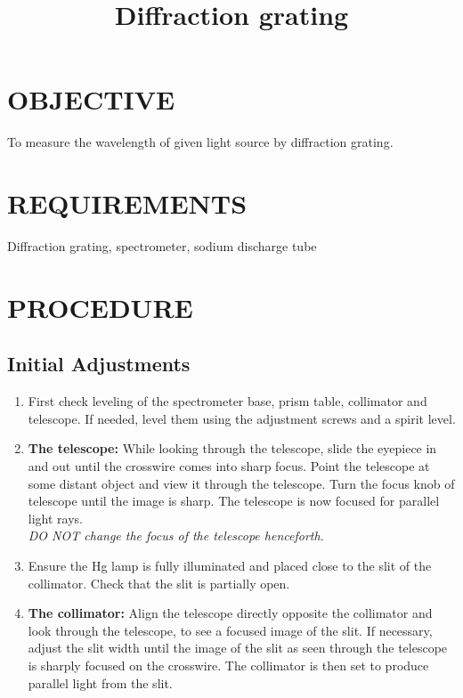 \documentclass[12pt,a4paper]{article}
\title{Diffraction grating}
\begin{document}
	\maketitle
	\section{OBJECTIVE}
		To measure the wavelength of given light source by diffraction grating.
		
	\section{REQUIREMENTS}
		Diffraction grating, spectrometer, sodium discharge tube
	
	\section{PROCEDURE}
		\subsection{Initial Adjustments}
		\begin{enumerate}
			\item 	 First check leveling of the spectrometer base, prism table, collimator and telescope. If needed, level them using the adjustment screws and a spirit level.
			
			
			\item 	\textbf{The telescope:} While looking through the telescope, slide the eyepiece in and out until the crosswire comes into sharp focus. Point the telescope at some distant object and view it through the telescope. Turn the focus knob of telescope until the image is sharp. The telescope is now focused for parallel light rays.\\
			\colorbox{yellow!25}{\emph{DO NOT change the focus of the telescope henceforth.}}
			
			\item 	Ensure the Hg lamp is fully illuminated and placed close to the slit of the collimator. Check that the slit is partially open.
			
			\item 	\textbf{The collimator:}  Align the telescope directly opposite the collimator and look through the telescope, to see a focused image of the slit. If necessary, adjust the slit width until the image of the slit as seen through the telescope is sharply focused on the crosswire. The collimator is then set to produce parallel light from the slit.
			
		\end{enumerate}
		
\end{document}

